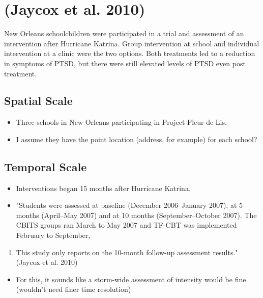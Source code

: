 \documentclass[
]{article}
\providecommand{\tightlist}{%
  \setlength{\itemsep}{0pt}\setlength{\parskip}{0pt}}
\begin{document}
\hypertarget{jaycox2010children}{%
\section{(Jaycox et al. 2010)}\label{jaycox2010children}}

New Orleans schoolchildren were participated in a trial and assessment
of an intervention after Hurricane Katrina. Group intervention at school
and individual intervention at a clinic were the two options. Both
treatments led to a reduction in symptoms of PTSD, but there were still
elevated levels of PTSD even post treatment.

\hypertarget{spatial-scale-12}{%
\subsection{Spatial Scale}\label{spatial-scale-12}}

\begin{itemize}
\tightlist
\item
  Three schools in New Orleans participating in Project Fleur-de-Lis.
\item
  I assume they have the point location (address, for example) for each
  school?
\end{itemize}

\hypertarget{temporal-scale-12}{%
\subsection{Temporal Scale}\label{temporal-scale-12}}

\begin{itemize}
\tightlist
\item
  Interventions began 15 months after Hurricane Katrina.
\item
  "Students were assessed at baseline (December 2006--January 2007), at
  5 months (April--May 2007) and at 10 months (September--October 2007).
  The CBITS groups ran March to May 2007 and TF-CBT was implemented
  February to September,
\end{itemize}

\begin{enumerate}
\def\labelenumi{\arabic{enumi}.}
\setcounter{enumi}{2006}
\tightlist
\item
  This study only reports on the 10-month follow-up assessment results."
  (Jaycox et al. 2010)
\end{enumerate}

\begin{itemize}
\tightlist
\item
  For this, it sounds like a storm-wide assessment of intensity would be
  fine (wouldn't need finer time resolution)
\end{itemize}
\end{document}

